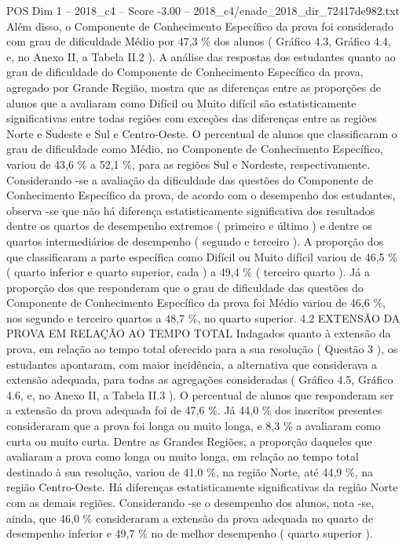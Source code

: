 \begin{textsample}{POS Dim 1 – 2018\_c4 – Score -3.00 – 2018\_c4/enade\_2018\_dir\_72417de982.txt}
Além disso, o Componente de Conhecimento Específico da prova foi considerado com grau de dificuldade Médio por 47,3 \% dos alunos ( Gráfico 4.3, Gráfico 4.4, e, no Anexo II, a Tabela II.2 ).
A análise das respostas dos estudantes quanto ao grau de dificuldade do Componente de Conhecimento Específico da prova, agregado por Grande Região, mostra que as diferenças entre as proporções de alunos que a avaliaram como Difícil ou Muito difícil são estatisticamente significativas entre todas regiões com exceções das diferenças entre as regiões Norte e Sudeste e Sul e Centro-Oeste.
O percentual de alunos que classificaram o grau de dificuldade como Médio, no Componente de Conhecimento Específico, variou de 43,6 \% a 52,1 \%, para as regiões Sul e Nordeste, respectivamente.
Considerando -se a avaliação da dificuldade das questões do Componente de Conhecimento Específico da prova, de acordo com o desempenho dos estudantes, observa -se que não há diferença estatisticamente significativa dos resultados dentre os quartos de desempenho extremos ( primeiro e último ) e dentre os quartos intermediários de desempenho ( segundo e terceiro ).
A proporção dos que classificaram a parte específica como Difícil ou Muito difícil variou de 46,5 \% ( quarto inferior e quarto superior, cada ) a 49,4 \% ( terceiro quarto ).
Já a proporção dos que responderam que o grau de dificuldade das questões do Componente de Conhecimento Específico da prova foi Médio variou de 46,6 \%, nos segundo e terceiro quartos a 48,7 \%, no quarto superior. 4.2 EXTENSÃO DA PROVA EM RELAÇÃO AO TEMPO TOTAL Indagados quanto à extensão da prova, em relação ao tempo total oferecido para a sua resolução ( Questão 3 ), os estudantes apontaram, com maior incidência, a alternativa que considerava a extensão adequada, para todas as agregações consideradas ( Gráfico 4.5, Gráfico 4.6, e, no Anexo II, a Tabela II.3 ).
O percentual de alunos que responderam ser a extensão da prova adequada foi de 47,6 \%.
Já 44,0 \% dos inscritos presentes consideraram que a prova foi longa ou muito longa, e 8,3 \% a avaliaram como curta ou muito curta.
Dentre as Grandes Regiões, a proporção daqueles que avaliaram a prova como longa ou muito longa, em relação ao tempo total destinado à sua resolução, variou de 41,0 \%, na região Norte, até 44,9 \%, na região Centro-Oeste.
Há diferenças estatisticamente significativas da região Norte com as demais regiões.
Considerando -se o desempenho dos alunos, nota -se, ainda, que 46,0 \% consideraram a extensão da prova adequada no quarto de desempenho inferior e 49,7 \% no de melhor desempenho ( quarto superior ).

\end{textsample}

